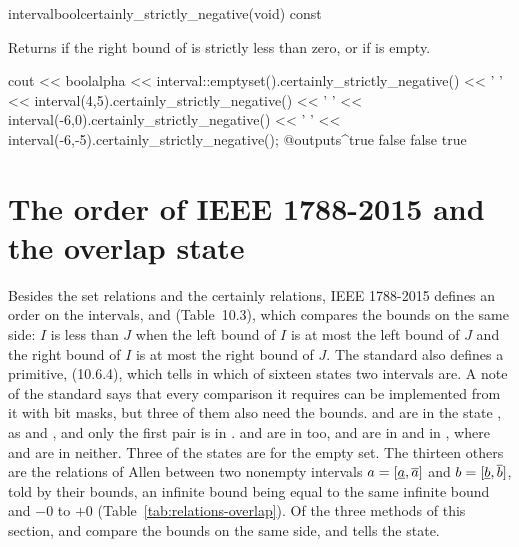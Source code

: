 \begin{defmethod}{interval}{bool}{certainly\_strictly\_negative}{(void) const}
  \begin{operation}
    \op{$\code{self}\subseteq\left[-\infty,0\right[$}
  \end{operation}
  Returns  if the right bound of  is strictly less
  than zero, or if  is empty.
\begin{example}
cout << boolalpha
     << interval::emptyset().certainly_strictly_negative() << ' '
     << interval(4,5).certainly_strictly_negative() << ' '
     << interval(-6,0).certainly_strictly_negative() << ' '
     << interval(-6,-5).certainly_strictly_negative();
@outputs^true false false true~
\end{example}
\end{defmethod}

\section{The order of IEEE 1788-2015 and the overlap state}
\label{sec:relations-order}
%

Besides the set relations and the certainly relations, IEEE 1788-2015
defines an order on the intervals,  and 
(Table~10.3), which compares the bounds on the same side: $I$ is less than
$J$ when the left bound of $I$ is at most the left bound of $J$ and the right
bound of $I$ is at most the right bound of $J$. The standard also defines a
primitive,  (10.6.4), which tells in which of sixteen states
two intervals are. A note of the standard says that every comparison it requires can be
implemented from it with bit masks, but three of them also need the bounds.
 and  are in the state , as 
and , and only the first pair is in .
 and  are in  too, and are in
 and in , where  and 
are in neither. Three of
the states are for the empty set. The thirteen others are the relations of
Allen between two nonempty intervals $a = [\underline{a}, \overline{a}]$
and $b = [\underline{b}, \overline{b}]$, told by their bounds, an infinite
bound being equal to the same infinite bound and $-0$ to $+0$
(Table~\ref{tab:relations-overlap}). Of the three methods of this section,
       and  compare the bounds on the same side,
      and  tells the state.

